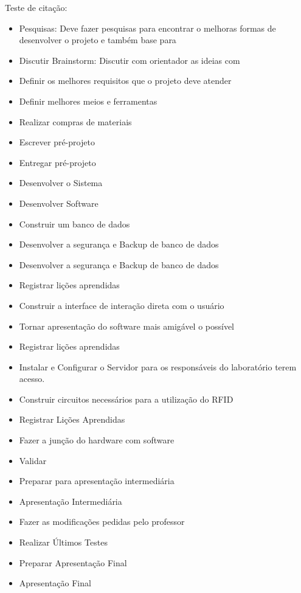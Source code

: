 \vspace{-42pt}
Teste de citação: \cite{DepEngEle}

\begin{itemize}
	\item Pesquisas: Deve fazer pesquisas para encontrar o melhoras formas de desenvolver o projeto e também base para  
	\item Discutir Brainstorm: Discutir com orientador as ideias com 
	\item Definir os melhores requisitos que o projeto deve atender
	\item Definir melhores meios e ferramentas
	\item Realizar compras de materiais
	\item Escrever pré-projeto
	\item Entregar pré-projeto
	\item Desenvolver o Sistema
	\item Desenvolver Software
	\item Construir um banco de dados
	\item Desenvolver a segurança e Backup de banco de dados
	\item Desenvolver a segurança e Backup de banco de dados
	\item Registrar lições aprendidas
	\item Construir a interface de interação direta com o usuário
	\item Tornar apresentação do software mais amigável o possível
	\item Registrar lições aprendidas
	\item Instalar e Configurar o Servidor para os responsáveis do laboratório terem acesso.
	\item Construir circuitos necessários para a utilização do RFID
	\item Registrar Lições Aprendidas
	\item Fazer a junção do hardware com software
	\item Validar
	\item Preparar para apresentação intermediária
	\item Apresentação Intermediária
	\item Fazer as modificações pedidas pelo professor
	\item Realizar Últimos Testes
	\item Preparar Apresentação Final
	\item Apresentação Final
\end{itemize}



